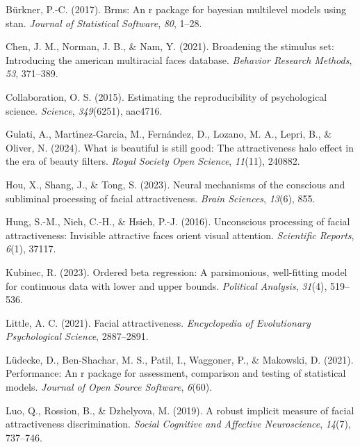 \documentclass[
  jou,
  floatsintext,
  longtable,
  nolmodern,
  notxfonts,
  notimes,
  colorlinks=true,linkcolor=blue,citecolor=blue,urlcolor=blue]{apa7}
\newlength{\cslhangindent}
\newenvironment{CSLReferences}[2] %
 {\begin{list}{}{%
  \setlength{\itemindent}{0pt}
  \setlength{\leftmargin}{0pt}
  \setlength{\parsep}{0pt}
  \ifodd #1
   \setlength{\leftmargin}{\cslhangindent}
   \setlength{\itemindent}{-1\cslhangindent}
  \fi
  \setlength{\itemsep}{#2\baselineskip}}}
 {\end{list}}
\begin{document}
\label{refs}
\begin{CSLReferences}{1}{0}
Bürkner, P.-C. (2017). Brms: An r package for bayesian multilevel models
using stan. \emph{Journal of Statistical Software}, \emph{80}, 1--28.

Chen, J. M., Norman, J. B., \& Nam, Y. (2021). Broadening the stimulus
set: Introducing the american multiracial faces database. \emph{Behavior
Research Methods}, \emph{53}, 371--389.

Collaboration, O. S. (2015). Estimating the reproducibility of
psychological science. \emph{Science}, \emph{349}(6251), aac4716.

Gulati, A., Martı́nez-Garcia, M., Fernández, D., Lozano, M. A., Lepri,
B., \& Oliver, N. (2024). What is beautiful is still good: The
attractiveness halo effect in the era of beauty filters. \emph{Royal
Society Open Science}, \emph{11}(11), 240882.

Hou, X., Shang, J., \& Tong, S. (2023). Neural mechanisms of the
conscious and subliminal processing of facial attractiveness.
\emph{Brain Sciences}, \emph{13}(6), 855.

Hung, S.-M., Nieh, C.-H., \& Hsieh, P.-J. (2016). Unconscious processing
of facial attractiveness: Invisible attractive faces orient visual
attention. \emph{Scientific Reports}, \emph{6}(1), 37117.

Kubinec, R. (2023). Ordered beta regression: A parsimonious,
well-fitting model for continuous data with lower and upper bounds.
\emph{Political Analysis}, \emph{31}(4), 519--536.

Little, A. C. (2021). Facial attractiveness. \emph{Encyclopedia of
Evolutionary Psychological Science}, 2887--2891.

Lüdecke, D., Ben-Shachar, M. S., Patil, I., Waggoner, P., \& Makowski,
D. (2021). Performance: An r package for assessment, comparison and
testing of statistical models. \emph{Journal of Open Source Software},
\emph{6}(60).

Luo, Q., Rossion, B., \& Dzhelyova, M. (2019). A robust implicit measure
of facial attractiveness discrimination. \emph{Social Cognitive and
Affective Neuroscience}, \emph{14}(7), 737--746.


\end{CSLReferences}
\end{document}
